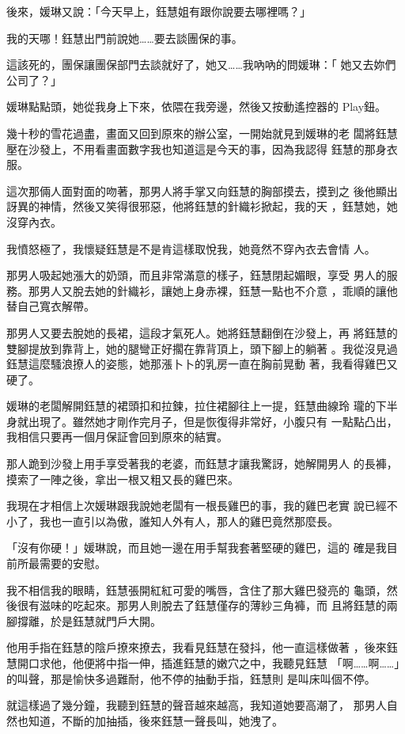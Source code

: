 後來，媛琳又說：「今天早上，鈺慧姐有跟你說要去哪裡嗎？」

我的天哪！鈺慧出門前說她……要去談團保的事。

這該死的，團保讓團保部門去談就好了，她又……我吶吶的問媛琳：「
她又去妳們公司了？」

媛琳點點頭，她從我身上下來，依隈在我旁邊，然後又按動遙控器的
Play鈕。

幾十秒的雪花過盡，畫面又回到原來的辦公室，一開始就見到媛琳的老
闆將鈺慧壓在沙發上，不用看畫面數字我也知道這是今天的事，因為我認得
鈺慧的那身衣服。

這次那倆人面對面的吻著，那男人將手掌又向鈺慧的胸部摸去，摸到之
後他顯出訝異的神情，然後又笑得很邪惡，他將鈺慧的針織衫掀起，我的天
，鈺慧她，她沒穿內衣。

我憤怒極了，我懷疑鈺慧是不是肯這樣取悅我，她竟然不穿內衣去會情
人。

那男人吸起她漲大的奶頭，而且非常滿意的樣子，鈺慧閉起媚眼，享受
男人的服務。那男人又脫去她的針織衫，讓她上身赤裸，鈺慧一點也不介意
，乖順的讓他替自己寬衣解帶。

那男人又要去脫她的長裙，這段才氣死人。她將鈺慧翻倒在沙發上，再
將鈺慧的雙腳提放到靠背上，她的腿彎正好擱在靠背頂上，頭下腳上的躺著
。我從沒見過鈺慧這麼騷浪撩人的姿態，她那漲卜卜的乳房一直在胸前晃動
著，我看得雞巴又硬了。

媛琳的老闆解開鈺慧的裙頭扣和拉鍊，拉住裙腳往上一提，鈺慧曲線玲
瓏的下半身就出現了。雖然她才剛作完月子，但是恢復得非常好，小腹只有
一點點凸出，我相信只要再一個月保証會回到原來的結實。

那人跪到沙發上用手享受著我的老婆，而鈺慧才讓我驚訝，她解開男人
的長褲，摸索了一陣之後，拿出一根又粗又長的雞巴來。

我現在才相信上次媛琳跟我說她老闆有一根長雞巴的事，我的雞巴老實
說已經不小了，我也一直引以為傲，誰知人外有人，那人的雞巴竟然那麼長。

「沒有你硬！」媛琳說，而且她一邊在用手幫我套著堅硬的雞巴，這的
確是我目前所最需要的安慰。

我不相信我的眼睛，鈺慧張開紅紅可愛的嘴唇，含住了那大雞巴發亮的
龜頭，然後很有滋味的吃起來。那男人則脫去了鈺慧僅存的薄紗三角褲，而
且將鈺慧的兩腳撐離，於是鈺慧就門戶大開。

他用手指在鈺慧的陰戶撩來撩去，我看見鈺慧在發抖，他一直這樣做著
，後來鈺慧開口求他，他便將中指一伸，插進鈺慧的嫩穴之中，我聽見鈺慧
「啊……啊……」的叫聲，那是愉快多過難耐，他不停的抽動手指，鈺慧則
是叫床叫個不停。

就這樣過了幾分鐘，我聽到鈺慧的聲音越來越高，我知道她要高潮了，
那男人自然也知道，不斷的加抽插，後來鈺慧一聲長叫，她洩了。

